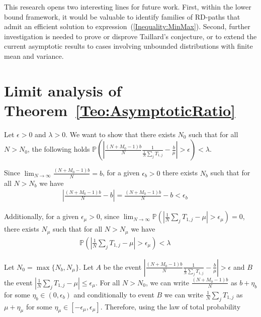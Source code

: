 \documentclass{article}
\theoremstyle{thmstyleone}%
\theoremstyle{thmstyletwo}%
\theoremstyle{thmstylethree}%
\begin{document}
This research opens two interesting lines for future work. 
First, within the lower bound framework, it would be valuable to identify families of RD-paths that admit an efficient solution to expression~(\ref{Inequality:MinMax}). 
Second, further investigation is needed to prove or disprove Taillard's conjecture, or to extend the current asymptotic results to cases involving unbounded distributions with finite mean and variance. 






  

\appendix
\section{Limit analysis of Theorem~\ref{Teo:AsymptoticRatio}}
\label{appendix:LimitAnalysis}


Let $\epsilon > 0$ and $\lambda > 0$. We want to show that there exists $N_0$ such that for all $N > N_0$, the following holds $\mathbb{P} \left(\left| \frac{(N + M_0 - 1)b}{N} \frac{1}{ \frac{1}{N} \sum_j T_{1,j} } - \frac{b}{\mu} \right| > \epsilon \right) < \lambda$. 

Since $\lim_{N \to \infty} \frac{(N + M_0 - 1)b}{N} =  b$, for a given $\epsilon_b > 0$ there exists $N_b$ such that for all $N > N_b$ we have 
\begin{align}
    \left| \frac{(N + M_0 - 1)b}{N} - b \right| = \frac{(N + M_0 - 1)b}{N} - b < \epsilon_b && \label{b_bound}
\end{align}

Additionally, for a given $\epsilon_{\mu} > 0$, since $\lim_{N \to \infty} \mathbb{P} \left( \left| \frac{1}{N} \sum_j T_{1,j} - \mu  \right| > \epsilon_{\mu} \right) = 0$, there exists $N_{\mu}$ such that for all $N > N_{\mu}$ we have 
\begin{align}
\mathbb{P} \left( \left| \frac{1}{N} \sum_j T_{1,j} - \mu \right| > \epsilon_{\mu} \right) < \lambda && \label{mu_bound}
\end{align}

Let $N_0 = \max \{N_b, N_{\mu}\}$. Let $A$ be the event $\left| \frac{(N + M_0 - 1)b}{N} \frac{1}{ \frac{1}{N} \sum_j T_{1,j} } - \frac{b}{\mu} \right| > \epsilon$ and $B$ the event $ \left| \frac{1}{N} \sum_j T_{1,j} - \mu \right| \leq \epsilon_{\mu}$. 
For all $N > N_0$, we can write $\frac{(N + M_0 - 1)b}{N}$ as $b + \eta_b$ for some $\eta_b \in (0, \epsilon_b)$ and conditionally to event $B$ we can write $\frac{1}{N} \sum_j T_{1,j}$ as $\mu + \eta_\mu$ for some $\eta_\mu \in [-\epsilon_\mu, \epsilon_\mu]$. 
Therefore, using the law of total probability
\end{document}
